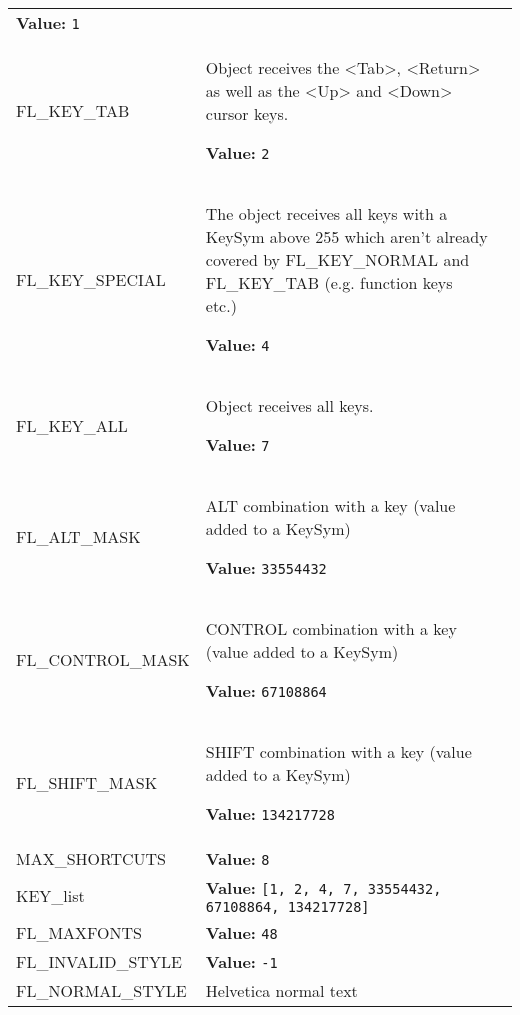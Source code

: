 \begin{longtable}{|p{\varnamewidth}|p{\vardescrwidth}|l}
\textbf{Value:} 
{\tt 1}&\\
\cline{1-2}
\raggedright F\-L\-\_\-K\-E\-Y\-\_\-T\-A\-B\- & \raggedright Object receives the {\textless}Tab{\textgreater}, 
          {\textless}Return{\textgreater} as well as the 
          {\textless}Up{\textgreater} and {\textless}Down{\textgreater} 
          cursor keys.

\textbf{Value:} 
{\tt 2}&\\
\cline{1-2}
\raggedright F\-L\-\_\-K\-E\-Y\-\_\-S\-P\-E\-C\-I\-A\-L\- & \raggedright The object receives all keys with a KeySym above 255 which aren't
          already covered by FL\_KEY\_NORMAL and FL\_KEY\_TAB (e.g. 
          function keys etc.)

\textbf{Value:} 
{\tt 4}&\\
\cline{1-2}
\raggedright F\-L\-\_\-K\-E\-Y\-\_\-A\-L\-L\- & \raggedright Object receives all keys.

\textbf{Value:} 
{\tt 7}&\\
\cline{1-2}
\raggedright F\-L\-\_\-A\-L\-T\-\_\-M\-A\-S\-K\- & \raggedright ALT combination with a key (value added to a KeySym)

\textbf{Value:} 
{\tt 33554432}&\\
\cline{1-2}
\raggedright F\-L\-\_\-C\-O\-N\-T\-R\-O\-L\-\_\-M\-A\-S\-K\- & \raggedright CONTROL combination with a key (value added to a KeySym)

\textbf{Value:} 
{\tt 67108864}&\\
\cline{1-2}
\raggedright F\-L\-\_\-S\-H\-I\-F\-T\-\_\-M\-A\-S\-K\- & \raggedright SHIFT combination with a key (value added to a KeySym)

\textbf{Value:} 
{\tt 134217728}&\\
\cline{1-2}
\raggedright M\-A\-X\-\_\-S\-H\-O\-R\-T\-C\-U\-T\-S\- & \raggedright \textbf{Value:} 
{\tt 8}&\\
\cline{1-2}
\raggedright K\-E\-Y\-\_\-l\-i\-s\-t\- & \raggedright \textbf{Value:} 
{\tt \texttt{[}1\texttt{, }2\texttt{, }4\texttt{, }7\texttt{, }33554432\texttt{, }67108864\texttt{, }134217728\texttt{]}}&\\
\cline{1-2}
\raggedright F\-L\-\_\-M\-A\-X\-F\-O\-N\-T\-S\- & \raggedright \textbf{Value:} 
{\tt 48}&\\
\cline{1-2}
\raggedright F\-L\-\_\-I\-N\-V\-A\-L\-I\-D\-\_\-S\-T\-Y\-L\-E\- & \raggedright \textbf{Value:} 
{\tt -1}&\\
\cline{1-2}
\raggedright F\-L\-\_\-N\-O\-R\-M\-A\-L\-\_\-S\-T\-Y\-L\-E\- & \raggedright Helvetica normal text


\end{longtable}
